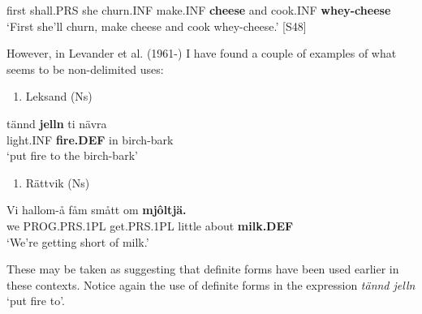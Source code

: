 first  shall.PRS  she  churn.INF  make.INF  \textbf{cheese} and  cook.INF  \textbf{whey-cheese} \\ %


‘First she’ll churn, make cheese and cook whey-cheese.’ [S48]
\z

However, in Levander et al. (1961-) I have found a couple of examples of what seems to be non-delimited uses:

\begin{enumerate} %
\item 
\label{bkm:Ref154222785}Leksand (Ns)

\end{enumerate} %
\ea\label{}
\gll tännd  \textbf{jelln} ti  nävra\\


light.INF  \textbf{fire.DEF} in  birch-bark\\ %


‘put fire to the birch-bark’
\z


\begin{enumerate} %
\item 
Rättvik (Ns)

\end{enumerate} %
\ea\label{}
\gll Vi  hallom-å  fåm  smått  om  \textbf{mjôltjä.}\\


we  PROG.PRS.1PL  get.PRS.1PL  little  about  \textbf{milk.DEF}\\ %


‘We’re getting short of milk.’
\z


These may be taken as suggesting that definite forms have been used earlier in these contexts.  Notice again the use of definite forms in the expression \textit{tännd jelln} ‘put fire to’.


